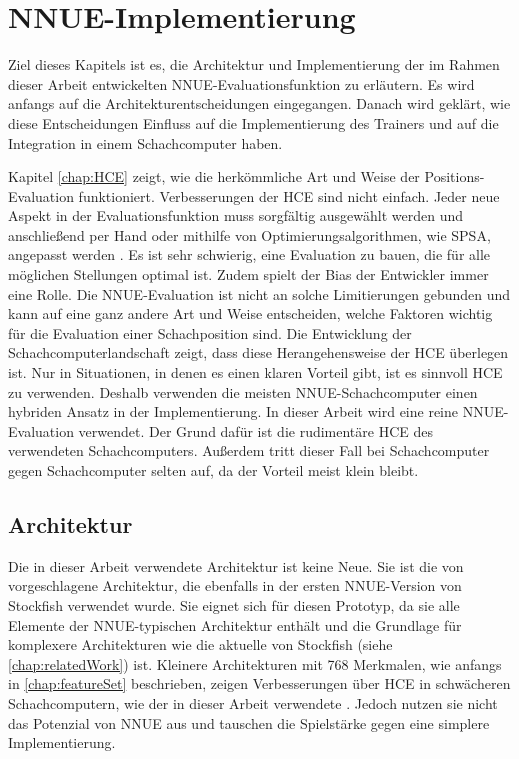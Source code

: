 \chapter{NNUE-Implementierung}

Ziel dieses Kapitels ist es, die Architektur und Implementierung der im Rahmen dieser Arbeit entwickelten \ac{NNUE}-Evaluationsfunktion zu erläutern. Es wird anfangs auf die Architekturentscheidungen eingegangen. Danach wird geklärt, wie diese Entscheidungen Einfluss auf die Implementierung des Trainers und auf die Integration in einem Schachcomputer haben.

Kapitel \autoref{chap:HCE} zeigt, wie die herkömmliche Art und Weise der Positions-Evaluation funktioniert. Verbesserungen der \ac{HCE} sind nicht einfach. Jeder neue Aspekt in der Evaluationsfunktion muss sorgfältig ausgewählt werden und anschließend per Hand oder mithilfe von Optimierungsalgorithmen, wie \zb{} \ac{SPSA}, angepasst werden \cite{spall1992multivariate}. Es ist sehr schwierig, eine Evaluation zu bauen, die für alle möglichen Stellungen optimal ist. Zudem spielt der Bias der Entwickler immer eine Rolle. Die \ac{NNUE}-Evaluation ist nicht an solche Limitierungen gebunden und kann auf eine ganz andere Art und Weise entscheiden, welche Faktoren wichtig für die Evaluation einer Schachposition sind. Die Entwicklung der Schachcomputerlandschaft zeigt, dass diese Herangehensweise der \ac{HCE} überlegen ist. Nur in Situationen, in denen es einen klaren Vorteil gibt, ist es sinnvoll \ac{HCE} zu verwenden. Deshalb verwenden die meisten \ac{NNUE}-Schachcomputer einen hybriden Ansatz in der Implementierung. In dieser Arbeit wird eine reine \ac{NNUE}-Evaluation verwendet. Der Grund dafür ist die rudimentäre \ac{HCE} des verwendeten Schachcomputers. Außerdem tritt dieser Fall bei Schachcomputer gegen Schachcomputer selten auf, da der Vorteil meist klein bleibt.

\section{Architektur}

Die in dieser Arbeit verwendete Architektur ist keine Neue. Sie ist die von \citeauthor{YNasu2018} \cite{YNasu2018} vorgeschlagene Architektur, die ebenfalls in der ersten \ac{NNUE}-Version von Stockfish verwendet wurde. Sie eignet sich für diesen Prototyp, da sie alle Elemente der \ac{NNUE}-typischen Architektur enthält und die Grundlage für komplexere Architekturen wie die aktuelle von Stockfish (siehe \autoref{chap:relatedWork}) ist. Kleinere Architekturen mit 768 Merkmalen, wie anfangs in \autoref{chap:featureSet} beschrieben, zeigen Verbesserungen über \ac{HCE} in schwächeren Schachcomputern, wie der in dieser Arbeit verwendete \cite{Smallbrain}. Jedoch nutzen sie nicht das Potenzial von \ac{NNUE} aus und tauschen die Spielstärke gegen eine simplere Implementierung.

